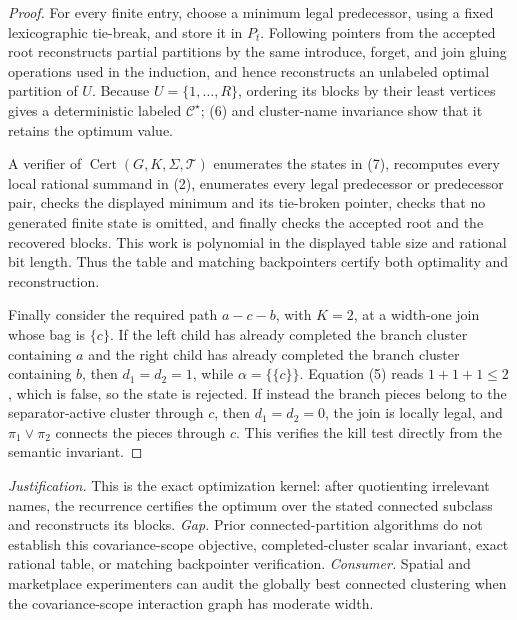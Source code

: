 \documentclass{article}
\begin{document}
\begin{proof}
For every finite entry, choose a minimum legal predecessor, using a fixed lexicographic tie-break, and store it in \(P_t\).  Following pointers from the accepted root reconstructs partial partitions by the same introduce, forget, and join gluing operations used in the induction, and hence reconstructs an unlabeled optimal partition of \(U\).  Because \(U=\{1,\ldots,R\}\), ordering its blocks by their least vertices gives a deterministic labeled \(\mathcal C^\star\); (6) and cluster-name invariance show that it retains the optimum value.

A verifier of \(\operatorname{Cert}(G,K,\Sigma,\mathcal T)\) enumerates the states in (7), recomputes every local rational summand in (2), enumerates every legal predecessor or predecessor pair, checks the displayed minimum and its tie-broken pointer, checks that no generated finite state is omitted, and finally checks the accepted root and the recovered blocks.  This work is polynomial in the displayed table size and rational bit length.  Thus the table and matching backpointers certify both optimality and reconstruction.

Finally consider the required path \(a-c-b\), with \(K=2\), at a width-one join whose bag is \(\{c\}\).  If the left child has already completed the branch cluster containing \(a\) and the right child has already completed the branch cluster containing \(b\), then \(d_1=d_2=1\), while \(\alpha=\{\{c\}\}\).  Equation (5) reads \(1+1+1\le2\), which is false, so the state is rejected.  If instead the branch pieces belong to the separator-active cluster through \(c\), then \(d_1=d_2=0\), the join is locally legal, and \(\pi_1\vee\pi_2\) connects the pieces through \(c\).  This verifies the kill test directly from the semantic invariant.
\end{proof}
\par\smallskip\noindent \textit{Justification.} This is the exact optimization kernel: after quotienting irrelevant names, the recurrence certifies the optimum over the stated connected subclass and reconstructs its blocks. \textit{Gap.} Prior connected-partition algorithms do not establish this covariance-scope objective, completed-cluster scalar invariant, exact rational table, or matching backpointer verification. \textit{Consumer.} Spatial and marketplace experimenters can audit the globally best connected clustering when the covariance-scope interaction graph has moderate width.
\end{document}
